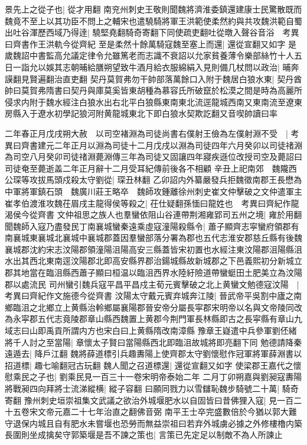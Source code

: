 景先上之從子也|{
	從才用翻}
南兖州刺史王敬則聞魏將濟淮委鎮還建康士民驚散既而魏竟不至上以其功臣不問上之輔宋也遣驍騎將軍王洪範使柔然約與共攻魏洪範自蜀出吐谷渾歷西域乃得逹|{
	驍堅堯翻騎奇寄翻下同使疏吏翻吐從暾入聲谷音浴　考異曰齊書作王洪軌今從齊紀}
至是柔然十餘萬騎寇魏至塞上而還|{
	還從宣翻又如字}
是歲魏詔中書監高允議定律令允雖篤老而志識不衰詔以允家貧養薄令樂部絲竹十人五日一詣允以娛其志朝晡給膳朔望致牛酒月給衣服綿絹入見則備几杖問以政治|{
	晡奔謨翻見賢遍翻治直吏翻}
契丹莫賀弗勿干帥部落萬餘口入附于魏居白狼水東|{
	契丹酋帥曰莫賀弗隋書曰契丹與庫莫奚皆東胡種為慕容氏所破竄於松漠之間是時為高麗所侵求内附于魏水經注白狼水出右北平白狼縣東南東北流逕龍城西南又東南流至遼東房縣入于遼水初學記狼河附黄龍城東北下即白狼水契欺訖翻又音喫帥讀曰率}


二年春正月戊戌朔大赦　以司空褚淵為司徒尚書右僕射王儉為左僕射淵不受　|{
	考異曰齊書建元二年正月以淵為司徒十二月戊戌以淵為司徒四年六月癸卯以司徒禇淵為司空八月癸卯司徒禇淵薨淵傳三年為司徒又固讓四年寢疾遜位改授司空及薨詔曰司徒奄至薨逝盖二年正月辭十二月受耳紀傳前後各不相顧}
辛丑上祀南郊　魏隴西公琛等攻拔馬頭戍殺太守劉從|{
	琛丑林翻}
乙卯詔内外纂嚴發兵拒魏徵南郡王長懋為中軍將軍鎮石頭　魏廣川莊王略卒　魏師攻鍾離徐州刺史崔文仲擊破之文仲遣軍主崔孝伯渡淮攻魏茌眉戌主龍得侯等殺之|{
	茌仕疑翻孫愐曰龍姓也　考異曰齊紀作龍渴侯今從齊書}
文仲祖思之族人也羣蠻依阻山谷連帶荆湘雍郢司五州之境|{
	雍於用翻}
聞魏師入寇乃盡發民丁南襄城蠻秦遠乘虛寇潼陽殺縣令|{
	蕭子顯齊志寜蠻府領郡有南襄城東襄城北襄城中襄城郡蓋因羣蠻部落分署為郡也五代志淮安郡慈丘縣有後魏襄城郡沈約宋志汶陽郡領潼陽沮陽高安三縣蓋皆宋初置也水經注東汶陽郡沮陽縣沮水出其西北東南逕汶陽郡北即高安縣界郡治鍚城縣故新城郡之下邑義熙初分新城立郡其地當在臨沮縣西蕭子顯曰桓温以臨沮西界水陸紆險道帶蠻蜓田土肥美立為汶陽郡以處流民}
司州蠻引魏兵寇平昌平昌戍主荀元賓擊破之北上黄蠻文勉德寇汶陽　|{
	考異曰齊紀作文施德今從齊書}
汶陽太守戴元賓弃城奔江陵|{
	晉武帝平吳割中廬之南鄉臨沮之北鄉立上黄縣治軨鄉屬襄陽郡晉安帝分屬長寜郡宋明帝以名與文帝陵同改為永寜郡五代志竟陵郡章山縣西魏置上黄郡今荆門軍長林縣即古之長寜縣有章山九域志曰山即禹貢所謂内方也宋白曰上黄縣隋改南漳縣}
豫章王嶷遣中兵參軍劉伾緒將千人討之至當陽|{
	章懷太子賢曰當陽縣西北即臨沮故城將即亮翻下同}
勉德請降秦遠遁去|{
	降戶江翻}
魏將薛道標引兵趣夀陽上使齊郡太守劉懷慰作冠軍將軍薛淵書以招道標|{
	趣七喻翻冠古玩翻}
魏人聞之召道標還|{
	還從宣翻又如字}
使梁郡王嘉代之懷慰乘民之子也|{
	劉乘民見一百三十一卷宋明帝泰始二年}
二月丁卯朔嘉與劉昶寇夀陽將戰昶四向拜將士流涕縱横|{
	縱子容翻}
曰願同戮力以雪讎恥魏步騎號二十萬|{
	騎奇寄翻}
豫州刺史垣崇祖集文武議之欲治外城堰肥水以自固皆曰昔佛狸入寇|{
	見一百二十五卷宋文帝元嘉二十七年治直之翻佛音弼}
南平王士卒完盛數倍於今猶以郭大難守退保内城且自有肥水未嘗堰也恐勞而無益崇祖曰若弃外城虜必據之外修樓櫓内築長圍則坐成擒矣守郭築堰是吾不諫之策也|{
	言策已先定足以制敵不為人所諫止}
